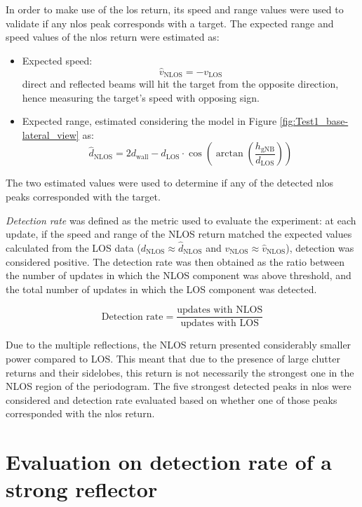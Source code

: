 In order to make use of the \gls{los} return, its speed and range values were used to validate if any \gls{nlos} peak corresponds with a target.
The expected range and speed values of the \gls{nlos} return were estimated as:

\begin{itemize}
	\item Expected speed:
	$$ \hat{v}_{\text{NLOS}} = -v_{\text{LOS}}$$
	direct and reflected beams will hit the target from the opposite direction, hence measuring the target's speed with opposing sign.
	\item Expected range, estimated considering the model in Figure \ref{fig:Test1_base-lateral_view} as:
	$$ \hat{d}_{\text{NLOS}} = 2 d_{\text{wall}} - d_{\text{LOS}}\cdot \cos{\left(\arctan{\left(\frac{h_{\text{gNB}}}{d_{\text{LOS}}}\right)}\right)}$$
\end{itemize}

The two estimated values were used to determine if any of the detected \gls{nlos} peaks corresponded with the target.

\textit{Detection rate} was defined as the metric used to evaluate the experiment: at each update, if the speed and range of the NLOS return matched the expected values calculated from the LOS data ($d_{\text{NLOS}} \approx  \hat{d}_{\text{NLOS}}$ and $v_{\text{NLOS}} \approx \hat{v}_{\text{NLOS}}$), detection was considered positive.
The detection rate was then obtained as the ratio between the number of updates in which the NLOS component was above threshold, and the total number of updates in which the LOS component was detected.


\begin{equation*}
	\text{Detection rate} = \frac{\text{updates with NLOS}}{\text{updates with LOS}}
\end{equation*}

Due to the multiple reflections, the NLOS return presented considerably smaller power compared to LOS.
This meant that due to the presence of large clutter returns and their sidelobes, this return is not necessarily the strongest one in the NLOS region of the periodogram.
The five strongest detected peaks in \gls{nlos} were considered and detection rate evaluated based on whether one of those peaks corresponded with the \gls{nlos} return.


\section{Evaluation on detection rate of a strong reflector}

